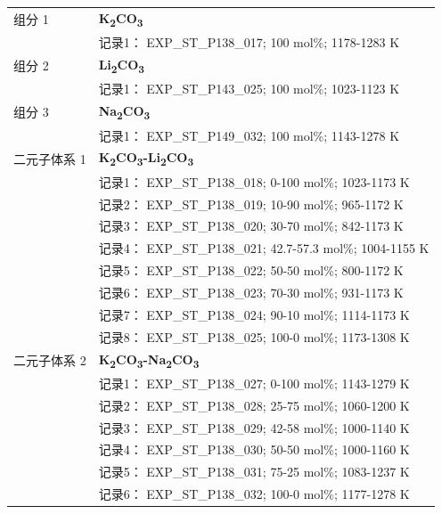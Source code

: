 \documentclass[12pt]{article}
\begin{document}
{\begin{longtable}[]{@{}
  >{\raggedright\arraybackslash}p{}
  >{\raggedright\arraybackslash}p{}@{}}
组分 1  & \textbf{K\textsubscript{2}CO\textsubscript{3}} \\
 & 记录1： EXP\_ST\_P138\_017; 100 mol\%; 1178-1283 K  \\

组分 2  & \textbf{Li\textsubscript{2}CO\textsubscript{3}} \\
 & 记录1： EXP\_ST\_P143\_025; 100 mol\%; 1023-1123 K  \\

组分 3  & \textbf{Na\textsubscript{2}CO\textsubscript{3}} \\
 & 记录1： EXP\_ST\_P149\_032; 100 mol\%; 1143-1278 K  \\

二元子体系 1  & \textbf{K\textsubscript{2}CO\textsubscript{3}-Li\textsubscript{2}CO\textsubscript{3}} \\
 & 记录1： EXP\_ST\_P138\_018; 0-100 mol\%; 1023-1173 K \\
 & 记录2： EXP\_ST\_P138\_019; 10-90 mol\%; 965-1172 K \\
 & 记录3： EXP\_ST\_P138\_020; 30-70 mol\%; 842-1173 K \\
 & 记录4： EXP\_ST\_P138\_021; 42.7-57.3 mol\%; 1004-1155 K \\
 & 记录5： EXP\_ST\_P138\_022; 50-50 mol\%; 800-1172 K \\
 & 记录6： EXP\_ST\_P138\_023; 70-30 mol\%; 931-1173 K \\
 & 记录7： EXP\_ST\_P138\_024; 90-10 mol\%; 1114-1173 K \\
 & 记录8： EXP\_ST\_P138\_025; 100-0 mol\%; 1173-1308 K  \\

二元子体系 2  & \textbf{K\textsubscript{2}CO\textsubscript{3}-Na\textsubscript{2}CO\textsubscript{3}} \\
 & 记录1： EXP\_ST\_P138\_027; 0-100 mol\%; 1143-1279 K \\
 & 记录2： EXP\_ST\_P138\_028; 25-75 mol\%; 1060-1200 K \\
 & 记录3： EXP\_ST\_P138\_029; 42-58 mol\%; 1000-1140 K \\
 & 记录4： EXP\_ST\_P138\_030; 50-50 mol\%; 1000-1160 K \\
 & 记录5： EXP\_ST\_P138\_031; 75-25 mol\%; 1083-1237 K \\
 & 记录6： EXP\_ST\_P138\_032; 100-0 mol\%; 1177-1278 K  \\


\end{longtable}}
\end{document}
